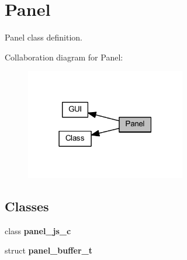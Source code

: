 \section{Panel}
\label{group___panel}


Panel class definition.  


Collaboration diagram for Panel\+:
\nopagebreak
\begin{figure}[H]
\begin{center}
\leavevmode
\includegraphics[width=198pt]{group___panel}
\end{center}
\end{figure}
\subsection*{Classes}
\begin{DoxyCompactItemize}
\item 
class \textbf{ panel\+\_\+js\+\_\+c}
\item 
struct \textbf{ panel\+\_\+buffer\+\_\+t}
\end{DoxyCompactItemize}
